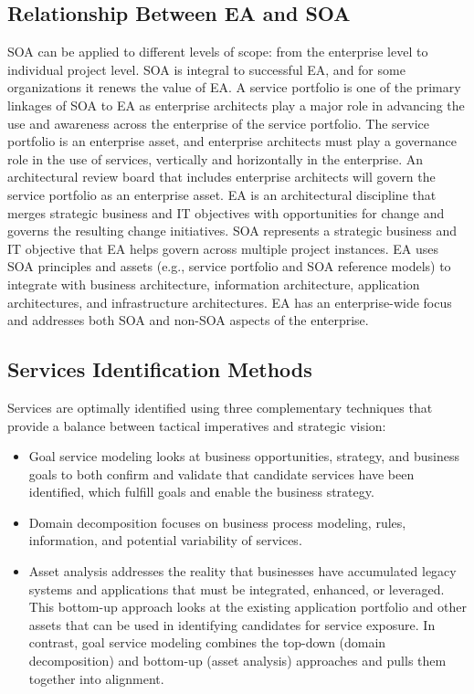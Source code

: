 \documentclass[12pt,a4paper,final,twoside,onecolumn,titlepage]{book}
\begin{document}
\subsection{Relationship Between EA and SOA}
\gls{SOA} can be applied to different levels of scope: from the enterprise level to individual project level. \gls{SOA} is integral to successful \gls{EA}, and for some organizations it renews the value of EA. A service portfolio is one of the primary linkages of \gls{SOA} to EA as enterprise architects play a major role in advancing the use and awareness across the enterprise of the service portfolio. The service portfolio is an enterprise asset, and enterprise architects must play a governance role in the use of services, vertically and horizontally in the enterprise. An architectural review board that includes enterprise architects will govern the service portfolio as an enterprise asset. EA is an architectural discipline that merges strategic business and IT objectives with opportunities for change and governs the resulting change initiatives. \gls{SOA} represents a strategic business and IT objective that EA helps govern across multiple project instances. EA uses \gls{SOA} principles and assets (e.g., service portfolio and \gls{SOA} reference models) to integrate with business architecture, information architecture, application architectures, and infrastructure architectures. EA has an enterprise-wide focus and addresses both \gls{SOA} and non-\gls{SOA} aspects of the enterprise.
\subsection{Services Identification Methods}
Services are optimally identified using three complementary techniques that provide a balance between tactical imperatives and strategic vision:
\begin{itemize}
\item Goal service modeling looks at business opportunities, strategy, and business goals to both confirm and validate that candidate services have been identified, which fulfill goals and enable the business strategy.
\item Domain decomposition focuses on business process modeling, rules, information, and potential variability of services.
\item Asset analysis addresses the reality that businesses have accumulated legacy systems and applications that must be integrated, enhanced, or leveraged. This bottom-up approach looks at the existing application portfolio and other assets that can be used in identifying candidates for service exposure. In contrast, goal service modeling combines the top-down (domain decomposition) and bottom-up (asset analysis) approaches and pulls them together into alignment.
\end{itemize}
\end{document}
